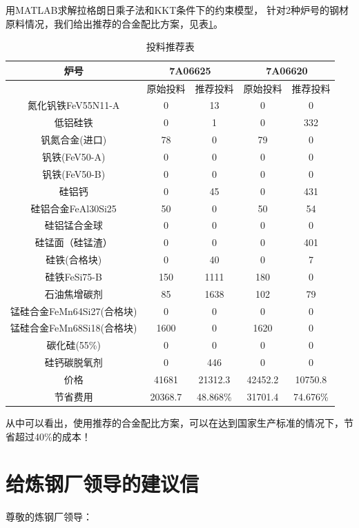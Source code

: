 \documentclass[12pt]{article}%
\begin{document}
用MATLAB求解拉格朗日乘子法和KKT条件下的约束模型，
针对2种炉号的钢材原料情况，我们给出推荐的合金配比方案，见表\ref{tab:tuij}。
\begin{table}[htbp]
  \centering
  \caption{投料推荐表}
    \begin{tabular}{|c|cc|cc|}
    \hline
    炉号 & \multicolumn{2}{c|}{7A06625} & \multicolumn{2}{c|}{7A06620} \\
    \hline
      & 原始投料 & 推荐投料 & 原始投料 & 推荐投料 \\
    氮化钒铁FeV55N11-A & 0 & 13 & 0 & 0 \\
    低铝硅铁 & 0 & 1 & 0 & 332 \\
    钒氮合金(进口) & 78 & 0 & 79 & 0 \\
    钒铁(FeV50-A) & 0 & 0 & 0 & 0 \\
    钒铁(FeV50-B) & 0 & 0 & 0 & 0 \\
    硅铝钙 & 0 & 45 & 0 & 431 \\
    硅铝合金FeAl30Si25 & 50 & 0 & 50 & 54 \\
    硅铝锰合金球 & 0 & 0 & 0 & 0 \\
    硅锰面（硅锰渣） & 0 & 0 & 0 & 401 \\
    硅铁(合格块) & 0 & 40 & 0 & 7 \\
    硅铁FeSi75-B & 150 & 1111 & 180 & 0 \\
    石油焦增碳剂 & 85 & 1638 & 102 & 79 \\
    锰硅合金FeMn64Si27(合格块) & 0 & 0 & 0 & 0 \\
    锰硅合金FeMn68Si18(合格块) & 1600 & 0 & 1620 & 0 \\
    碳化硅(55\%) & 0 & 0 & 0 & 0 \\
    硅钙碳脱氧剂 & 0 & 446 & 0 & 0 \\
    \hline
    价格 & 41681 & 21312.3 & 42452.2 & 10750.8 \\
    \hline
    节省费用&20368.7&48.868\%&31701.4&74.676\%\\
    \hline
    \end{tabular}%
  \label{tab:tuij}%
\end{table}%
从中可以看出，使用推荐的合金配比方案，可以在达到国家生产标准的情况下，节省超过40\%的成本！
\newpage
\section{给炼钢厂领导的建议信}
\noindent 尊敬的炼钢厂领导：
\end{document}
